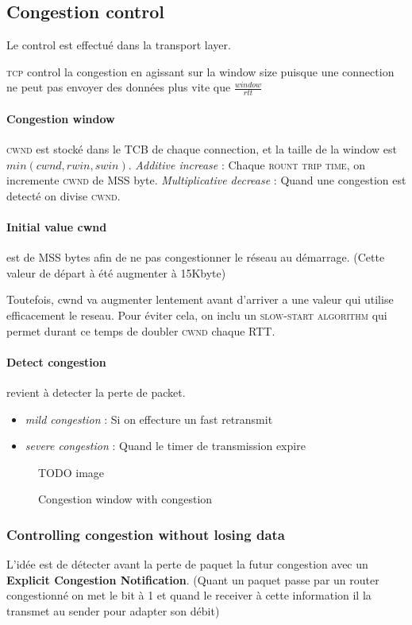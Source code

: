 \subsection{Congestion control}
Le control est effectué dans la transport layer.

\textsc{tcp} control la congestion en agissant sur la window size puisque une connection
ne peut pas envoyer des données plus vite que $\frac{window}{rtt}$

\paragraph{Congestion window}
\textsc{cwnd} est stocké dans le \textsc{TCB} de chaque connection, et la taille de la window
est $min(cwnd, rwin, swin)$.  \textit{Additive increase} : Chaque \textsc{rount trip time}, on incremente \textsc{cwnd} de MSS byte. \textit{Multiplicative decrease} : Quand une congestion
est detecté on divise \textsc{cwnd}.

\paragraph{Initial value cwnd}
est de MSS bytes afin de ne pas congestionner le réseau au démarrage.
(Cette valeur de départ à été augmenter à 15Kbyte)


Toutefois, cwnd va augmenter lentement avant d'arriver a une valeur qui utilise efficacement le
reseau. Pour éviter cela, on inclu un \textsc{slow-start algorithm} qui permet durant ce temps
de doubler \textsc{cwnd} chaque RTT.

\paragraph{Detect congestion} revient à detecter la perte de packet.
\begin{itemize}
    \item \textit{mild congestion} : Si on effecture un fast retransmit
    \item \textit{severe congestion} : Quand le timer de transmission expire
\end{itemize}

\begin{figure}
    TODO image
   \caption{Congestion window with congestion}
\end{figure}

\subsubsection{Controlling congestion without losing data}
L'idée est de détecter avant la perte de paquet la futur congestion avec un
\textbf{Explicit Congestion Notification}. (Quant un paquet passe par un router
congestionné on met le bit à 1 et quand le receiver à cette information il la
transmet au sender pour adapter son débit)

